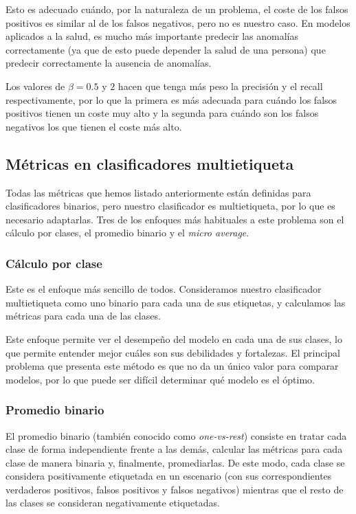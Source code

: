 Esto es adecuado cuándo, por la naturaleza de un problema, el coste de los falsos positivos es similar al de los falsos negativos, pero no es nuestro caso. En modelos aplicados a la salud, es mucho más importante predecir las anomalías correctamente (ya que de esto puede depender la salud de una persona) que predecir correctamente la ausencia de anomalías.

Los valores de $\beta=0.5$ y $2$ hacen que tenga más peso la precisión y el recall respectivamente, por lo que la primera es más adecuada para cuándo los falsos positivos tienen un coste muy alto y la segunda para cuándo son los falsos negativos los que tienen el coste más alto.

\subsection{Métricas en clasificadores multietiqueta}
Todas las métricas que hemos listado anteriormente están definidas para clasificadores binarios, pero nuestro clasificador es multietiqueta, por lo que es necesario adaptarlas. Tres de los enfoques más habituales a este problema son el cálculo por clases, el promedio binario y el \emph{micro average}.

\subsubsection{Cálculo por clase}
Este es el enfoque más sencillo de todos. Consideramos nuestro clasificador multietiqueta como uno binario para cada una de sus etiquetas, y calculamos las métricas para cada una de las clases.

Este enfoque permite ver el desempeño del modelo en cada una de sus clases, lo que permite entender mejor cuáles son sus debilidades y fortalezas. El principal problema que presenta este método es que no da un único valor para comparar modelos, por lo que puede ser difícil determinar qué modelo es el óptimo.

\subsubsection{Promedio binario}
El promedio binario (también conocido como \emph{one-vs-rest}) consiste en tratar cada clase de forma independiente frente a las demás, calcular las métricas para cada clase de manera binaria y, finalmente, promediarlas. De este modo, cada clase se considera positivamente etiquetada en un escenario (con sus correspondientes verdaderos positivos, falsos positivos y falsos negativos) mientras que el resto de las clases se consideran negativamente etiquetadas.


